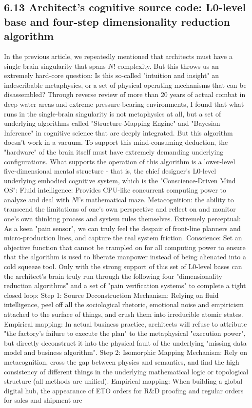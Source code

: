 \documentclass[11pt,a4paper]{article}
\begin{document}
\subsection*{6.13 Architect's cognitive source code: L0-level base and four-step dimensionality reduction algorithm}


In the previous article, we repeatedly mentioned that architects must have a single-brain singularity that spans $N!$ complexity. But this throws us an extremely hard-core question: Is this so-called "intuition and insight" an indescribable metaphysics, or a set of physical operating mechanisms that can be disassembled? Through reverse review of more than 20 years of actual combat in deep water areas and extreme pressure-bearing environments, I found that what runs in the single-brain singularity is not metaphysics at all, but a set of underlying algorithms called "Structure-Mapping Engine" and "Bayesian Inference" in cognitive science that are deeply integrated. But this algorithm doesn't work in a vacuum. To support this mind-consuming deduction, the "hardware" of the brain itself must have extremely demanding underlying configurations. What supports the operation of this algorithm is a lower-level five-dimensional mental structure - that is, the chief designer's L0-level underlying embodied cognitive system, which is the "Conscience-Driven Mind OS": Fluid intelligence: Provides CPU-like concurrent computing power to analyze and deal with $N!$'s mathematical maze. Metacognition: the ability to transcend the limitations of one's own perspective and reflect on and monitor one's own thinking process and system rules themselves. Extremely perceptual: As a keen "pain sensor", we can truly feel the despair of front-line planners and micro-production lines, and capture the real system friction. Conscience: Set an objective function that cannot be trampled on for all computing power to ensure that the algorithm is used to liberate manpower instead of being alienated into a cold squeeze tool. Only with the strong support of this set of L0-level bases can the architect's brain truly run through the following four "dimensionality reduction algorithms" and a set of "pain verification systems" to complete a tight closed loop: Step 1: Source Deconstruction Mechanism: Relying on fluid intelligence, peel off all the sociological rhetoric, emotional noise and empiricism attached to the surface of things, and crush them into irreducible atomic states. Empirical mapping: In actual business practice, architects will refuse to attribute "the factory's failure to execute the plan" to the metaphysical "execution power", but directly deconstruct it into the physical fault of the underlying "missing data model and business algorithm". Step 2: Isomorphic Mapping Mechanism: Rely on metacognition, cross the gap between physics and semantics, and find the high consistency of different things in the underlying mathematical logic or topological structure (all methods are unified). Empirical mapping: When building a global digital hub, the appearance of ETO orders for R\&D proofing and regular orders for sales and shipment are 
\end{document}
